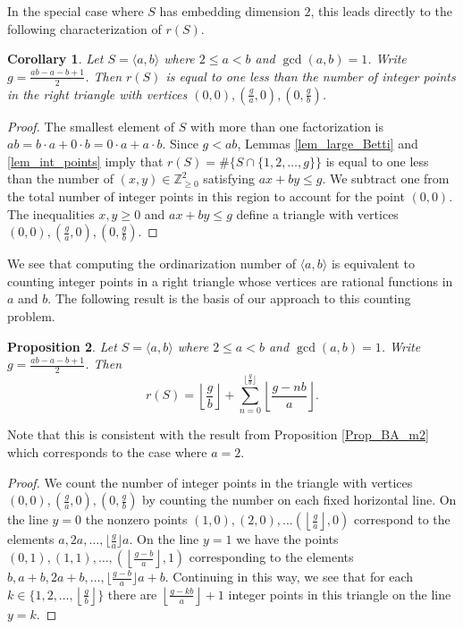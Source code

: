 \documentclass[12pt]{amsart}
\newcommand{\Z}{{\mathbb Z}}
\theoremstyle{plain}\newtheorem{proposition}{Proposition}[section]
\newtheorem{cor}[proposition]{Corollary}
\newtheorem{prop}[proposition]{Proposition}
\begin{document}
In the special case where $S$ has embedding dimension $2$, this leads directly to the following characterization of $r(S)$.
\begin{cor}\label{cor:count_int_triangle}
Let $S = \langle a,b \rangle$ where $2\le a < b$ and $\gcd(a,b) = 1$.  Write $g = \frac{ab-a-b+1}{2}$.  Then $r(S)$ is equal to one less than the number of integer points in the right triangle with vertices $(0,0),\left(\frac{g}{a},0\right), \left(0,\frac{g}{b}\right)$.
\end{cor}
\begin{proof}
The smallest element of $S$ with more than one factorization is $ab = b\cdot a + 0\cdot b = 0\cdot a + a\cdot b$.  Since $g < ab$, Lemmas \ref{lem_large_Betti} and \ref{lem_int_points} imply that $r(S) = \#\{S\cap \{1,2,\ldots, g\}\}$ is equal to one less than the number of $(x,y) \in \Z_{\ge 0}^2$ satisfying $ax + by \le g$.  We subtract one from the total number of integer points in this region to account for the point $(0,0)$.  The inequalities $x,y \ge 0$ and $ax + by \le g$ define a triangle with vertices $(0,0),\left(\frac{g}{a},0\right), \left(0,\frac{g}{b}\right)$.
\end{proof}

We see that computing the ordinarization number of $\langle a,b\rangle$ is equivalent to counting integer points in a right triangle whose vertices are rational functions in $a$ and $b$.   The following result is the basis of our approach to this counting problem.
\begin{prop}\label{2genO}
Let $S = \langle a,b\rangle$ where $2\le a < b$ and $\gcd(a,b) = 1$. Write $g = \frac{ab-a-b+1}{2}$.  Then
\[
r(S) =\left\lfloor\frac{g}{b}\right\rfloor +\sum\limits_{n=0}^{\lfloor\frac{g}{b}\rfloor}\left\lfloor \frac{g-nb}{a}\right\rfloor.
\]
\end{prop}
\noindent Note that this is consistent with the result from Proposition \ref{Prop_BA_m2} which corresponds to the case where $a=2$.

\begin{proof}
We count the number of  integer points in the triangle with vertices $(0,0),\left(\frac{g}{a},0\right), \left(0,\frac{g}{b}\right)$ by counting the number on each fixed horizontal line.  On the line $y = 0$ the nonzero points $(1,0),(2,0),\ldots \left(\left\lfloor\frac{g}{a}\right\rfloor,0\right)$ correspond to the elements $a, 2a,\dots, \big\lfloor \frac{g}{a}\big\rfloor a$.  On the line $y=1$ we have the points $(0,1),(1,1),\ldots, \left(\left\lfloor\frac{g-b}{a}\right\rfloor,1\right)$ corresponding to the elements $b, a+b, 2a+b,\dots, \big\lfloor\frac{g-b}{a}\big\rfloor a+b$.  Continuing in this way, we see that for each $k \in \{1,2,\ldots, \left\lfloor\frac{g}{b}\right\rfloor\}$ there are $\left\lfloor \frac{g-kb}{a}\right\rfloor + 1$ integer points in this triangle on the line $y=k$.
\end{proof}
\end{document}
